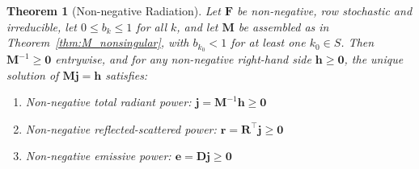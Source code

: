 \documentclass[preprint,1p,times]{elsarticle}
\theoremstyle{plain}
\newtheorem{theorem}{Theorem}[section]
\theoremstyle{definition}
\theoremstyle{remark}
\begin{document}
\begin{theorem}[Non-negative Radiation]
\label{thm:physical_correctness}
Let $\mathbf{F}$ be non-negative, row stochastic and irreducible, let $0 \leq b_k \leq 1$ for all $k$, and let $\mathbf{M}$ be assembled as in Theorem~\ref{thm:M_nonsingular}, with $b_{k_0} < 1$ for at least one $k_0 \in S$. Then $\mathbf{M}^{-1} \geq \mathbf{0}$ entrywise, and for any non-negative right-hand side $\mathbf{h} \geq \mathbf{0}$, the unique solution of $\mathbf{M}\mathbf{j} = \mathbf{h}$ satisfies:
\begin{enumerate}
\item Non-negative total radiant power: $\mathbf{j} = \mathbf{M}^{-1}\mathbf{h} \geq \mathbf{0}$
\item Non-negative reflected-scattered power: $\mathbf{r} = \mathbf{R}^\top\mathbf{j} \geq \mathbf{0}$
\item Non-negative emissive power: $\mathbf{e} = \mathbf{D}\mathbf{j} \geq \mathbf{0}$
\end{enumerate}
\end{theorem}
\end{document}
